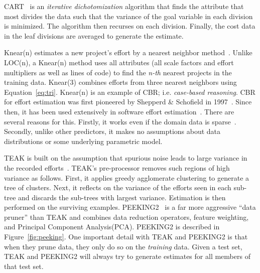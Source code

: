 \documentclass[smallcondesed]{svjour3}
\newcommand{\fig}[1]{Figure~\ref{fig:#1}}
\newenvironment{BLUE}{\color{black}}{\ignorespacesafterend}
\newcommand{\HERE}[1]{}
\begin{document}
CART~\cite{breiman84} is an {\em iterative dichotomization} algorithm
that finds the attribute that most divides the data such that
the variance of the goal variable in each division is minimized.
The algorithm then recurses on each division. 
Finally, the cost data in the leaf divisions
are averaged to generate the estimate. 


Knear(n) estimates a new project's effort
by a nearest neighbor  method~\cite{shepperd97}. Unlike LOC(n),
a Knear(n) method uses all attributes
(all scale factors and effort multipliers as well as lines of code)
to find the {\em n-th} nearest projects in the training data. 
Knear(3) combines efforts from three nearest neighbors using
Equation~\ref{eq:tri}.
Knear(n) is an example of CBR; i.e.  {\em case-based reasoning}.
CBR for effort estimation was 
first pioneered by Shepperd \& Schofield
in 1997~\cite{shepperd97}.
  Since then, it 
has been used extensively in software effort
estimation~\cite{Auer2006,Walkerden1999,%
  Kirsopp2002,shepperd97,kadoda00,Li2008,Li2006,Li2007,Li2009a,
  keung2008a,keung2008b,keung2008c}.  
There are several reasons  for this. Firstly, 
it works even if the domain data is sparse~\cite{Myrtveit}.
Secondly, 
unlike other predictors, it makes no assumptions about data
distributions or some  underlying parametric model. 

TEAK is built
on the assumption that spurious noise leads to large variance in the recorded efforts~\cite{koc11b}.
TEAK's pre-processor removes such regions of high variance as follows.
First, it  applies greedy agglomerate clustering  to generate a tree of clusters.
Next, it reflects on the variance
of the efforts seen in each sub-tree and discards the sub-trees with largest variance. Estimation is then performed
on the surviving examples.
PEEKING2~\cite{papa13} is a far more aggressive ``data pruner'' than TEAK and combines   data reduction operators, 
feature weighting, and Principal Component Analysis(PCA). PEEKING2 is described in  \fig{peeking}.
\begin{BLUE}\HERE{Reviewer2d}
  One important detail with TEAK and PEEKING2 is that when they prune data, they
  only do so on the {\em training} data. Given a test set, TEAK and PEEKING2 will always try to
  generate estimates for all members of that test set.
  \end{BLUE}
  
\end{document}
